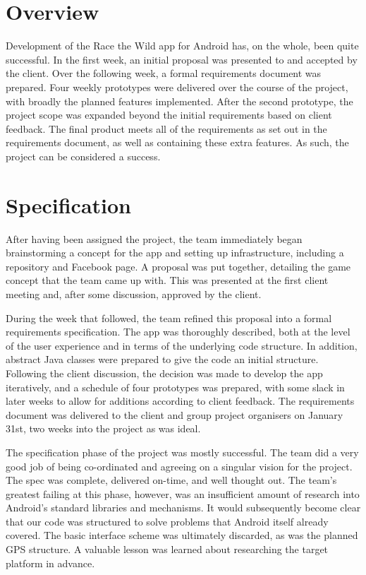 \documentclass[12pt,a4paper,twoside]{article}
\begin{document}

\newpage
\pagestyle{empty}
\cleardoublepage                             %
\newpage

\section{Overview}

Development of the Race the Wild app for Android has, on the whole, been quite successful. 
In the first week, an initial proposal was presented to and accepted by the client. 
Over the following week, a formal requirements document was prepared. 
Four weekly prototypes were delivered over the course of the project, with broadly the planned features implemented. 
After the second prototype, the project scope was expanded beyond the initial requirements based on client feedback. 
The final product meets all of the requirements as set out in the requirements document, as well as containing these extra features. 
As such, the project can be considered a success.

\section{Specification}

After having been assigned the project, the team immediately began brainstorming a concept for the app and setting up infrastructure, including a repository and Facebook page. 
A proposal was put together, detailing the game concept that the team came up with. 
This was presented at the first client meeting and, after some discussion, approved by the client.

During the week that followed, the team refined this proposal into a formal requirements specification. 
The app was thoroughly described, both at the level of the user experience and in terms of the underlying code structure. 
In addition, abstract Java classes were prepared to give the code an initial structure. 
Following the client discussion, the decision was made to develop the app iteratively, and a schedule of four prototypes was prepared, with some slack in later weeks to allow for additions according to client feedback. 
The requirements document was delivered to the client and group project organisers on January 31st, two weeks into the project as was ideal.

The specification phase of the project was mostly successful. 
The team did a very good job of being co-ordinated and agreeing on a singular vision for the project. 
The spec was complete, delivered on-time, and well thought out. 
The team's greatest failing at this phase, however, was an insufficient amount of research into Android's standard libraries and mechanisms. 
It would subsequently become clear that our code was structured to solve problems that Android itself already covered. 
The basic interface scheme was ultimately discarded, as was the planned GPS structure. 
A valuable lesson was learned about researching the target platform in advance.
\end{document}
